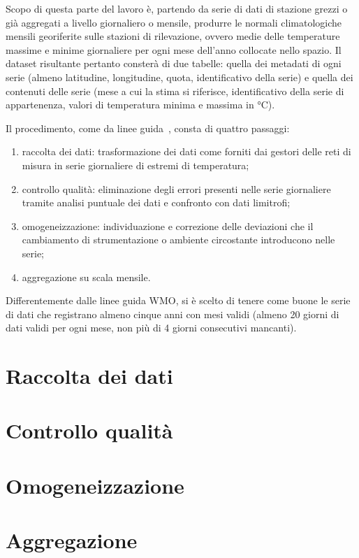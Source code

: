 
Scopo di questa parte del lavoro è, partendo da serie di dati di stazione grezzi o già aggregati a livello giornaliero o mensile, produrre le normali climatologiche mensili georiferite sulle stazioni di rilevazione, ovvero medie delle temperature massime e minime giornaliere per ogni mese dell'anno collocate nello spazio. Il dataset risultante pertanto consterà di due tabelle: quella dei metadati di ogni serie (almeno latitudine, longitudine, quota, identificativo della serie) e quella dei contenuti delle serie (mese a cui la stima si riferisce, identificativo della serie di appartenenza, valori di temperatura minima e massima in \(\unit{\degreeCelsius}\)).

Il procedimento, come da linee guida~\cite{WMOGuidelinesNormalsCalculation2017}, consta di quattro passaggi:

\begin{enumerate}
  \item raccolta dei dati: trasformazione dei dati come forniti dai gestori
    delle reti di misura in serie giornaliere di estremi di temperatura;
  \item controllo qualità: eliminazione degli errori presenti nelle serie
    giornaliere tramite analisi puntuale dei dati e confronto con dati
    limitrofi;
  \item omogeneizzazione: individuazione e correzione delle deviazioni che il
    cambiamento di strumentazione o ambiente circostante introducono nelle
    serie;
  \item aggregazione su scala mensile.
\end{enumerate}

Differentemente dalle linee guida WMO, si è scelto di tenere come buone le serie di dati che registrano almeno cinque anni con mesi validi (almeno 20 giorni di dati validi per ogni mese, non più di 4 giorni consecutivi mancanti).

\section{Raccolta dei dati}\label{ch:raccolta-dati}


\section{Controllo qualità}\label{ch:qc}


\section{Omogeneizzazione}\label{ch:homo}


\section{Aggregazione}\label{ch:aggregazione}
